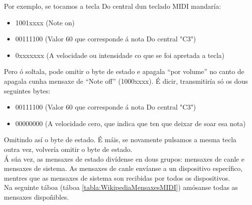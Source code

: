     Por exemplo, se tocamos a tecla Do central dun teclado MIDI mandaría:

    \begin{itemize}
     \item 1001xxxx (Note on)
     \item 00111100 (Valor 60 que corresponde á nota Do central "C3")
     \item 0xxxxxxx (A velocidade ou intensidade co que se foi apretada a
           tecla)
    \end{itemize}

    Pero ó soltala, pode omitir o byte de estado e apagala ``por volume'' no
    canto de apagala cunha mensaxe de ``Note off'' (1000xxxx). É dicir,
    transmitiría só os dous seguintes bytes:

    \begin{itemize}
     \item 00111100 (Valor 60 que corresponde á nota Do central "C3")
     \item 00000000 (A velocidade cero, que indica que ten que deixar de soar
           esa nota)
    \end{itemize}

    Omitindo así o byte de estado. É máis, se novamente pulsamos a mesma tecla
    outra vez, volvería omitir o byte de estado. \\

    Á súa vez, as mensaxes de estado divídense en dous grupos: mensaxes de
    canle e mensaxes de sistema. As mensaxes de canle envíanse a un dispositivo
    específico, mentres que as mensaxes de sistema son recibidas por todos os
    dispositivos. \\

    Na seguinte táboa (táboa \ref{tabla:WikipediaMensaxesMIDI}) amósanse todas
    as mensaxes dispoñibles. \\

